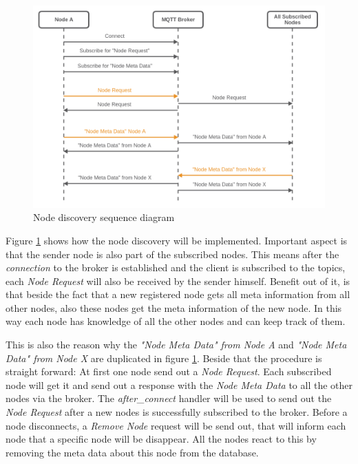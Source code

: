 \begin{figure}[H]
    \centering
    \includegraphics[width=\textwidth]{resources/images/node_discovery.png}
    \caption[Node discovery sequence diagram]{Node discovery sequence diagram}
    \label{fig:node_discovery_squ_dia}
\end{figure}

Figure \ref{fig:node_discovery_squ_dia} shows how the node discovery will be implemented.
Important aspect is that the sender node is also part of the subscribed nodes.
This means after the \textit{connection} to the broker is established and the client is subscribed to the topics, each \textit{Node Request} will also be received by the sender himself.
Benefit out of it, is that beside the fact that a new registered node gets all meta information from all other nodes, also these nodes get the meta information of the new node.
In this way each node has knowledge of all the other nodes and can keep track of them.\newline

This is also the reason why the \textit{"Node Meta Data" from Node A} and \textit{"Node Meta Data" from Node X} are duplicated in figure \ref{fig:node_discovery_squ_dia}.
Beside that the procedure is straight forward: At first one node send out a \textit{Node Request}.
Each subscribed node will get it and send out a response with the \textit{Node Meta Data} to all the other nodes via the broker.
The \textit{after\_connect} handler will be used to send out the \textit{Node Request} after a new nodes is successfully subscribed to the broker.
Before a node disconnects, a \textit{Remove Node} request will be send out, that will inform each node that a specific node will be disappear.
All the nodes react to this by removing the meta data about this node from the database.


